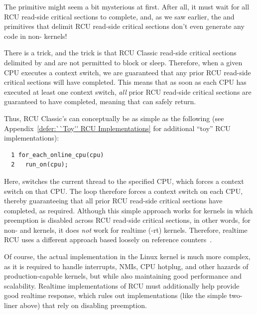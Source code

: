 The  primitive might seem a bit
mysterious at first.
After all, it must wait for all RCU read-side critical sections to
complete, and, as we saw earlier, the
 and  primitives
that delimit RCU read-side critical sections don't even generate any
code in non- kernels!

There is a trick, and the trick is that RCU Classic read-side critical
sections delimited by  and
 are not permitted to block or sleep.
Therefore, when a given CPU executes a context switch, we are guaranteed
that any prior RCU read-side critical sections will have completed.
This means that as soon as each
CPU has executed at least one context switch, \emph{all}
prior RCU read-side critical sections are guaranteed to have completed,
meaning that  can safely return.

Thus, RCU Classic's 
can conceptually be as simple as the following
(see Appendix~\ref{defer:``Toy'' RCU Implementations}
for additional ``toy'' RCU implementations):

\vspace{5pt}
\begin{minipage}[t]{\columnwidth}
\begin{verbatim}
  1 for_each_online_cpu(cpu)
  2   run_on(cpu);
\end{verbatim}
\end{minipage}
\vspace{5pt}

Here,  switches the current thread to the
specified CPU, which forces a context switch on that CPU.
The  loop therefore forces a
context switch on each CPU, thereby guaranteeing that all prior
RCU read-side critical sections have completed, as required.
Although this simple approach works for kernels in which preemption
is disabled across RCU read-side critical sections, in other
words, for non- and 
kernels, it does \emph{not} work for 
realtime (-rt) kernels.
Therefore, realtime RCU uses a different approach based loosely on reference
counters~\cite{PaulEMcKenney2007PreemptibleRCU}.

Of course, the actual implementation in the Linux kernel
is much more complex, as it is required
to handle interrupts, NMIs, CPU hotplug, and other hazards of
production-capable kernels, but while also maintaining good performance and
scalability.
Realtime implementations of RCU must additionally help provide good
realtime response, which rules out implementations (like the simple
two-liner above) that rely on disabling preemption.

